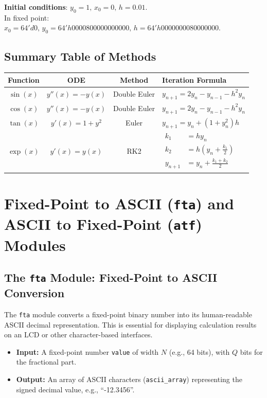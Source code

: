 \documentclass[conference]{IEEEtran}
\begin{document}
\begin{FlushLeft}
\begin{flushleft}
\textbf{Initial conditions}: \( y_0 = 1,\, x_0 = 0,\, h = 0.01 \). \\
In fixed point: \( x_0 = 64'd0,\, y_0 = 64'h0000800000000000,\, h = 64'h0000000080000000 \).
\end{flushleft}

\subsection*{Summary Table of Methods}
\begin{table}[ht]
\centering
\begin{tabular}{|c|c|c|l|}
\hline
Function & ODE & Method & Iteration Formula \\
\hline
$\sin(x)$    & $y''(x) = -y(x)$  & Double Euler & $y_{n+1} = 2y_n - y_{n-1} - h^2 y_n$ \\
$\cos(x)$    & $y''(x) = -y(x)$  & Double Euler & $y_{n+1} = 2y_n - y_{n-1} - h^2 y_n$ \\
$\tan(x)$    & $y'(x) = 1+y^2$   & Euler        & $y_{n+1} = y_n + (1 + y_n^2) h$ \\
$\exp(x)$    & $y'(x) = y(x)$    & RK2          & $\begin{aligned}
k_1 &= h y_n \\
k_2 &= h (y_n + \frac{k_1}{2})\\
y_{n+1} &= y_n + \frac{k_1 + k_2}{2}
\end{aligned}$ \\
\hline
\end{tabular}
\end{table}

\section{Fixed-Point to ASCII (\texttt{fta}) and ASCII to Fixed-Point (\texttt{atf}) Modules}

\subsection{The \texttt{fta} Module: Fixed-Point to ASCII Conversion}

The \texttt{fta} module converts a fixed-point binary number into its human-readable ASCII decimal representation. This is essential for displaying calculation results on an LCD or other character-based interfaces.

\begin{itemize}
    \item \textbf{Input:} A fixed-point number \texttt{value} of width $N$ (e.g., 64 bits), with $Q$ bits for the fractional part.
    \item \textbf{Output:} An array of ASCII characters (\texttt{ascii\_array}) representing the signed decimal value, e.g., ``-12.3456''.
\end{itemize}


\end{FlushLeft}
\end{document}
